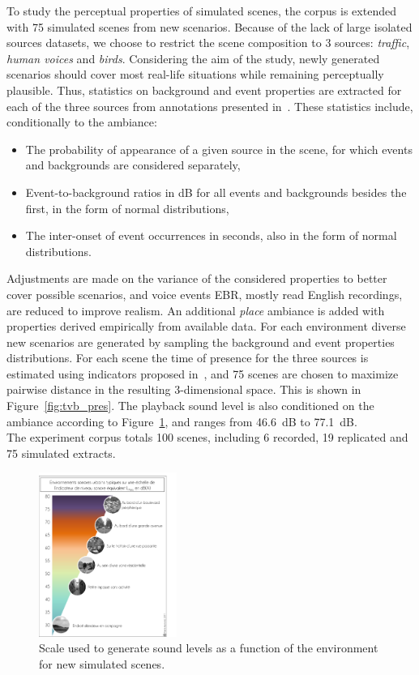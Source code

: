\documentclass[11pt,a4paper]{article}
\begin{document}
To study the perceptual properties of simulated scenes, the corpus is extended with 75 simulated scenes from new scenarios. Because of the lack of large isolated sources datasets, we choose to restrict the scene composition to 3 sources: \textit{traffic}, \textit{human voices} and \textit{birds}. Considering the aim of the study, newly generated scenarios should cover most real-life situations while remaining perceptually plausible. Thus, statistics on background and event properties are extracted for each of the three sources from annotations presented in~\cite{gloaguen2017}. These statistics include, conditionally to the ambiance:
\begin{itemize}
\item The probability of appearance of a given source in the scene, for which events and backgrounds are considered separately,
\item Event-to-background ratios in dB for all events and backgrounds besides the first, in the form of normal distributions,
\item The inter-onset of event occurrences in seconds, also in the form of normal distributions.
\end{itemize}
Adjustments are made on the variance of the considered properties to better cover possible scenarios, and voice events EBR, mostly read English recordings, are reduced to improve realism. An additional \textit{place} ambiance is added with properties derived empirically from available data. For each environment diverse new scenarios are generated by sampling the background and event properties distributions. For each scene the time of presence for the three sources is estimated using indicators proposed in~\cite{gontier2018}, and 75 scenes are chosen to maximize pairwise distance in the resulting 3-dimensional space. This is shown in Figure~\ref{fig:tvb_pres}. The playback sound level is also conditioned on the ambiance according to Figure~\ref{fig:amb_levels}, and ranges from 46.6~dB to 77.1~dB.\\

The experiment corpus totals 100 scenes, including 6 recorded, 19 replicated and 75 simulated extracts.

\begin{figure}[!h]
    \centering
    \includegraphics[width=0.4\textwidth]{figures/leqa.png}
    \caption{Scale used to generate sound levels as a function of the environment for new simulated scenes.}\label{fig:amb_levels}
\end{figure}
\end{document}

